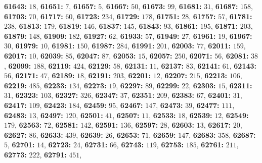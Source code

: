 \textsf{\bfseries 61643:} $18$, \textsf{\bfseries 61651:} $7$, \textsf{\bfseries 61657:} $5$, \textsf{\bfseries 61667:} $50$, \textsf{\bfseries 61673:} $99$, \textsf{\bfseries 61681:} $31$, \textsf{\bfseries 61687:} $158$, \textsf{\bfseries 61703:} $70$, \textsf{\bfseries 61717:} $60$, \textsf{\bfseries 61723:} $234$, \textsf{\bfseries 61729:} $178$, \textsf{\bfseries 61751:} $28$, \textsf{\bfseries 61757:} $57$, \textsf{\bfseries 61781:} $238$, \textsf{\bfseries 61813:} $179$, \textsf{\bfseries 61819:} $146$, \textsf{\bfseries 61837:} $145$, \textsf{\bfseries 61843:} $93$, \textsf{\bfseries 61861:} $195$, \textsf{\bfseries 61871:} $203$, \textsf{\bfseries 61879:} $148$, \textsf{\bfseries 61909:} $182$, \textsf{\bfseries 61927:} $62$, \textsf{\bfseries 61933:} $57$, \textsf{\bfseries 61949:} $27$, \textsf{\bfseries 61961:} $19$, \textsf{\bfseries 61967:} $30$, \textsf{\bfseries 61979:} $10$, \textsf{\bfseries 61981:} $150$, \textsf{\bfseries 61987:} $284$, \textsf{\bfseries 61991:} $201$, \textsf{\bfseries 62003:} $77$, \textsf{\bfseries 62011:} $159$, \textsf{\bfseries 62017:} $10$, \textsf{\bfseries 62039:} $85$, \textsf{\bfseries 62047:} $87$, \textsf{\bfseries 62053:} $15$, \textsf{\bfseries 62057:} $250$, \textsf{\bfseries 62071:} $56$, \textsf{\bfseries 62081:} $38$, \textsf{\bfseries 62099:} $188$, \textsf{\bfseries 62119:} $424$, \textsf{\bfseries 62129:} $58$, \textsf{\bfseries 62131:} $11$, \textsf{\bfseries 62137:} $83$, \textsf{\bfseries 62141:} $61$, \textsf{\bfseries 62143:} $56$, \textsf{\bfseries 62171:} $47$, \textsf{\bfseries 62189:} $18$, \textsf{\bfseries 62191:} $203$, \textsf{\bfseries 62201:} $12$, \textsf{\bfseries 62207:} $215$, \textsf{\bfseries 62213:} $106$, \textsf{\bfseries 62219:} $485$, \textsf{\bfseries 62233:} $134$, \textsf{\bfseries 62273:} $19$, \textsf{\bfseries 62297:} $89$, \textsf{\bfseries 62299:} $22$, \textsf{\bfseries 62303:} $15$, \textsf{\bfseries 62311:} $31$, \textsf{\bfseries 62323:} $103$, \textsf{\bfseries 62327:} $326$, \textsf{\bfseries 62347:} $37$, \textsf{\bfseries 62351:} $209$, \textsf{\bfseries 62383:} $67$, \textsf{\bfseries 62401:} $31$, \textsf{\bfseries 62417:} $109$, \textsf{\bfseries 62423:} $184$, \textsf{\bfseries 62459:} $95$, \textsf{\bfseries 62467:} $147$, \textsf{\bfseries 62473:} $39$, \textsf{\bfseries 62477:} $111$, \textsf{\bfseries 62483:} $13$, \textsf{\bfseries 62497:} $120$, \textsf{\bfseries 62501:} $41$, \textsf{\bfseries 62507:} $11$, \textsf{\bfseries 62533:} $18$, \textsf{\bfseries 62539:} $12$, \textsf{\bfseries 62549:} $179$, \textsf{\bfseries 62563:} $72$, \textsf{\bfseries 62581:} $142$, \textsf{\bfseries 62591:} $136$, \textsf{\bfseries 62597:} $28$, \textsf{\bfseries 62603:} $13$, \textsf{\bfseries 62617:} $20$, \textsf{\bfseries 62627:} $86$, \textsf{\bfseries 62633:} $439$, \textsf{\bfseries 62639:} $26$, \textsf{\bfseries 62653:} $71$, \textsf{\bfseries 62659:} $147$, \textsf{\bfseries 62683:} $358$, \textsf{\bfseries 62687:} $5$, \textsf{\bfseries 62701:} $14$, \textsf{\bfseries 62723:} $24$, \textsf{\bfseries 62731:} $66$, \textsf{\bfseries 62743:} $119$, \textsf{\bfseries 62753:} $185$, \textsf{\bfseries 62761:} $211$, \textsf{\bfseries 62773:} $222$, \textsf{\bfseries 62791:} $451$, 
